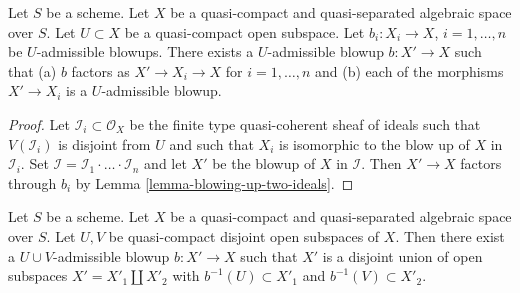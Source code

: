 \begin{lemma}
\label{lemma-dominate-admissible-blowups}
Let $S$ be a scheme.
Let $X$ be a quasi-compact and quasi-separated algebraic space over $S$.
Let $U \subset X$ be a quasi-compact open subspace.
Let $b_i : X_i \to X$, $i = 1, \ldots, n$ be $U$-admissible blowups.
There exists a $U$-admissible blowup $b : X' \to X$ such that
(a) $b$ factors as $X' \to X_i \to X$ for $i = 1, \ldots, n$ and
(b) each of the morphisms $X' \to X_i$ is a $U$-admissible blowup.
\end{lemma}

\begin{proof}
Let $\mathcal{I}_i \subset \mathcal{O}_X$ be the finite type
quasi-coherent sheaf of ideals such that $V(\mathcal{I}_i)$ is
disjoint from $U$ and such that $X_i$ is isomorphic to the
blow up of $X$ in $\mathcal{I}_i$. Set
$\mathcal{I} = \mathcal{I}_1 \cdot \ldots \cdot \mathcal{I}_n$
and let $X'$ be the blowup of $X$ in $\mathcal{I}$. Then
$X' \to X$ factors through $b_i$ by Lemma \ref{lemma-blowing-up-two-ideals}.
\end{proof}

\begin{lemma}
\label{lemma-separate-disjoint-opens-by-blowing-up}
Let $S$ be a scheme.
Let $X$ be a quasi-compact and quasi-separated algebraic space over $S$.
Let $U, V$ be quasi-compact disjoint open subspaces of $X$.
Then there exist a $U \cup V$-admissible blowup $b : X' \to X$
such that $X'$ is a disjoint union of open subspaces
$X' = X'_1 \amalg X'_2$ with $b^{-1}(U) \subset X'_1$ and
$b^{-1}(V) \subset X'_2$.
\end{lemma}

